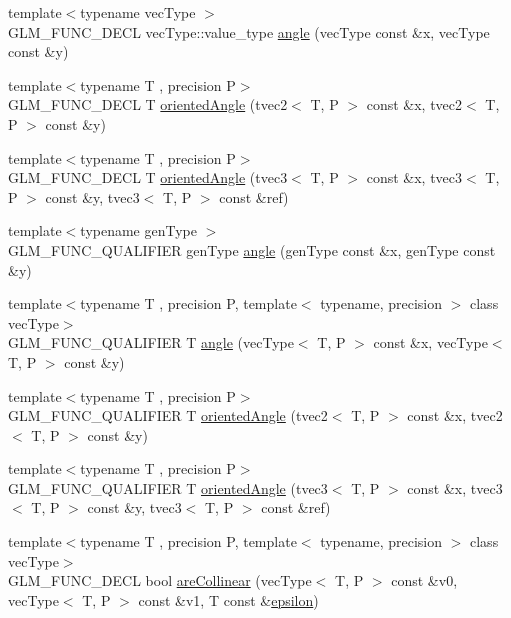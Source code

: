 \begin{DoxyCompactItemize}
\item 
{\footnotesize template$<$typename vec\+Type $>$ }\\G\+L\+M\+\_\+\+F\+U\+N\+C\+\_\+\+D\+E\+C\+L vec\+Type\+::value\+\_\+type \hyperlink{group__gtx__vector__angle_gab8691008a2536b681b711211816c14f7}{angle} (vec\+Type const \&x, vec\+Type const \&y)
\item 
{\footnotesize template$<$typename T , precision P$>$ }\\G\+L\+M\+\_\+\+F\+U\+N\+C\+\_\+\+D\+E\+C\+L T \hyperlink{group__gtx__vector__angle_ga82a19d474be13c92c7b10caab42a5a72}{oriented\+Angle} (tvec2$<$ T, P $>$ const \&x, tvec2$<$ T, P $>$ const \&y)
\item 
{\footnotesize template$<$typename T , precision P$>$ }\\G\+L\+M\+\_\+\+F\+U\+N\+C\+\_\+\+D\+E\+C\+L T \hyperlink{group__gtx__vector__angle_ga7254dba112eff55f55f9544f41cb9ece}{oriented\+Angle} (tvec3$<$ T, P $>$ const \&x, tvec3$<$ T, P $>$ const \&y, tvec3$<$ T, P $>$ const \&ref)
\item 
{\footnotesize template$<$typename gen\+Type $>$ }\\G\+L\+M\+\_\+\+F\+U\+N\+C\+\_\+\+Q\+U\+A\+L\+I\+F\+I\+E\+R gen\+Type \hyperlink{namespaceglm_a0634619b62db66fe6a4bd04da1feabea}{angle} (gen\+Type const \&x, gen\+Type const \&y)
\item 
{\footnotesize template$<$typename T , precision P, template$<$ typename, precision $>$ class vec\+Type$>$ }\\G\+L\+M\+\_\+\+F\+U\+N\+C\+\_\+\+Q\+U\+A\+L\+I\+F\+I\+E\+R T \hyperlink{namespaceglm_a8501bc310fa98bb40bec1b3c285183f1}{angle} (vec\+Type$<$ T, P $>$ const \&x, vec\+Type$<$ T, P $>$ const \&y)
\item 
{\footnotesize template$<$typename T , precision P$>$ }\\G\+L\+M\+\_\+\+F\+U\+N\+C\+\_\+\+Q\+U\+A\+L\+I\+F\+I\+E\+R T \hyperlink{group__gtx__vector__angle_ga82a19d474be13c92c7b10caab42a5a72}{oriented\+Angle} (tvec2$<$ T, P $>$ const \&x, tvec2$<$ T, P $>$ const \&y)
\item 
{\footnotesize template$<$typename T , precision P$>$ }\\G\+L\+M\+\_\+\+F\+U\+N\+C\+\_\+\+Q\+U\+A\+L\+I\+F\+I\+E\+R T \hyperlink{group__gtx__vector__angle_ga7254dba112eff55f55f9544f41cb9ece}{oriented\+Angle} (tvec3$<$ T, P $>$ const \&x, tvec3$<$ T, P $>$ const \&y, tvec3$<$ T, P $>$ const \&ref)
\item 
{\footnotesize template$<$typename T , precision P, template$<$ typename, precision $>$ class vec\+Type$>$ }\\G\+L\+M\+\_\+\+F\+U\+N\+C\+\_\+\+D\+E\+C\+L bool \hyperlink{group__gtx__vector__query_ga465b844190d1740051e45d780832ea4c}{are\+Collinear} (vec\+Type$<$ T, P $>$ const \&v0, vec\+Type$<$ T, P $>$ const \&v1, T const \&\hyperlink{group__gtc__constants_ga2a1e57fc5592b69cfae84174cbfc9429}{epsilon})

\end{DoxyCompactItemize}
